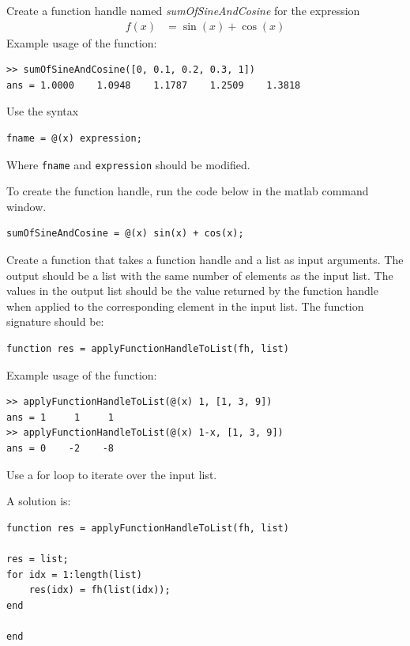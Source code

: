 \begin{ex}
Create a function handle named \emph{sumOfSineAndCosine} for the expression
\begin{align*}
f(x) & = \sin(x) + \cos(x)
\end{align*}
Example usage of the function:
\begin{lstlisting}
>> sumOfSineAndCosine([0, 0.1, 0.2, 0.3, 1])
ans = 1.0000    1.0948    1.1787    1.2509    1.3818
\end{lstlisting}
\begin{hint}
Use the syntax
\begin{lstlisting}
fname = @(x) expression;
\end{lstlisting}
Where \verb!fname! and \verb!expression! should be modified.
\end{hint}
\begin{sol}
To create the function handle, run the code below in the matlab command window.
\begin{lstlisting}
sumOfSineAndCosine = @(x) sin(x) + cos(x);
\end{lstlisting}
\end{sol}
\end{ex}



\begin{ex}
Create a function that takes a function handle and a list as input arguments.
The output should be a list with the same number of elements as the input list.
The values in the output list should be the value returned by the function handle 
when applied to the corresponding element in the input list.
The function signature should be:
\begin{lstlisting}
function res = applyFunctionHandleToList(fh, list)
\end{lstlisting}
Example usage of the function:
\begin{lstlisting}
>> applyFunctionHandleToList(@(x) 1, [1, 3, 9])
ans = 1     1     1
>> applyFunctionHandleToList(@(x) 1-x, [1, 3, 9])
ans = 0    -2    -8
\end{lstlisting}
\begin{hint}
Use a for loop to iterate over the input list.
\end{hint}
\begin{sol}
A solution is:
\begin{lstlisting}
function res = applyFunctionHandleToList(fh, list)

res = list;
for idx = 1:length(list)
	res(idx) = fh(list(idx));
end

end
\end{lstlisting}
\end{sol}
\end{ex}


